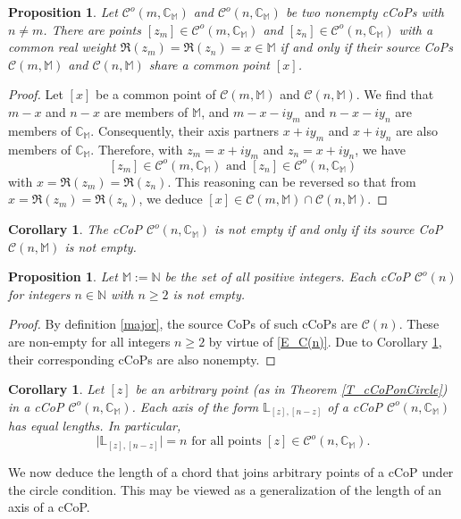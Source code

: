 \documentclass[12pt]{amsart}
\newtheorem{proposition}[theorem]{Proposition}
\newtheorem{corollary}[theorem]{Corollary}
\theoremstyle{definition}
\theoremstyle{remark}
\numberwithin{equation}{section}
\newcommand{\abs}[1]{\lvert#1\rvert}
\newcommand{\C}{\mathcal{C}}
\newcommand{\CC}{\mathbb{C}}
\newcommand{\M}{\mathbb{M}}
\newcommand{\N}{\mathbb{N}}
\newcommand{\LL}{\mathbb{L}}
\begin{document}
\begin{proposition}\label{P_equMembers}
Let $\C^o(m,\CC_{\M})$ and $\C^o(n,\CC_{\M})$ be two nonempty cCoPs with $n\neq m$. There are points $[z_m]\in\C^o(m,\CC_{\M})$ and $[z_n]\in\C^o(n,\CC_{\M})$ with a common real weight $\Re(z_m)=\Re(z_n)=x\in\M$ if and only if their source CoPs $\C(m,\M)$ and $\C(n,\M)$ share a common point $[x]$.
\end{proposition}

\begin{proof}
Let $[x]$ be a common point of $\C(m,\M)$ and $\C(n,\M)$. We find that $m-x$ and $n-x$ are members of $\M$, and $m-x-iy_m$ and $n-x-iy_n$ are members of $\CC_{\M}$. Consequently, their axis partners $x+iy_m$ and $x+iy_n$ are also members of $\CC_{\M}$. Therefore, with $z_m=x+iy_m$ and $z_n=x+iy_n$, we have
\[
[z_m]\in\C^o(m,\CC_{\M})\mbox{ and }[z_n]\in\C^o(n,\CC_{\M})
\]
with $x=\Re(z_m)=\Re(z_n)$. This reasoning can be reversed so that from $x=\Re(z_m)=\Re(z_n)$, we deduce $[x]\in\C(m,\M)\cap\C(n,\M)$. 
\end{proof}
\bigskip

\begin{corollary}\label{C-c_equ_source}
The cCoP $\C^o(n,\CC_{\M})$ is not empty if and only if its source CoP $\C(n,\M)$ is not empty.
\end{corollary}
\bigskip

\begin{proposition}\label{P-cCoP(N)}
Let $\M:=\N$ be the set of all positive integers. Each cCoP $\C^o(n)$ for integers $n\in \mathbb{N}$ with $n\geq 2$ is not empty.
\end{proposition}

\begin{proof}
By definition \ref{major}, the source CoPs of such cCoPs are $\C(n)$. These are non-empty for all integers $n\geq 2$ by virtue of \eqref{E_C(n)}. Due to Corollary \ref{C-c_equ_source}, their corresponding cCoPs are also nonempty.
\end{proof}

\begin{corollary}
Let $[z]$ be an arbitrary point (as in Theorem \ref{T_cCoPonCircle}) in a cCoP $\C^o(n,\CC_{\M})$. Each axis of the form $\LL_{[z],[n-z]}$ of a cCoP $\C^o(n,\CC_{\M})$ has equal lengths. In particular,
\[
\abs{\LL_{[z],[n-z]}}=n\mbox{ for all points }[z]\in\C^o(n,\CC_{\M}).
\]
\end{corollary}
\bigskip

We now deduce the length of a chord that joins arbitrary points of a cCoP under the circle condition. This may be viewed as a generalization of the length of an axis of a cCoP.
\end{document}
